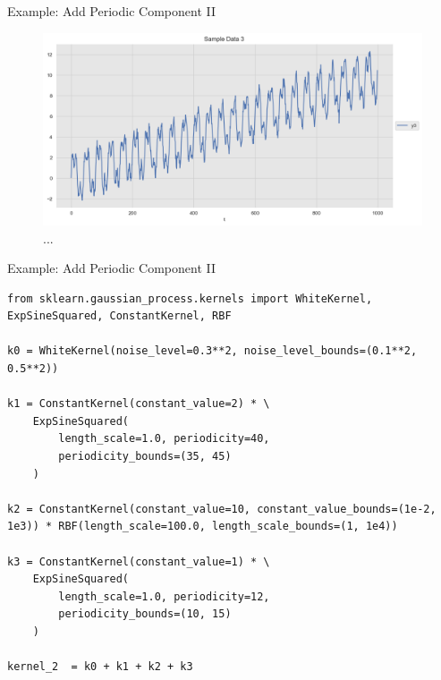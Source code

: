 \documentclass[10pt]{beamer}
\begin{document}
\begin{frame}{Example: Add Periodic Component II }
\begin{center}
\begin{figure}
\includegraphics[scale=0.4]{images/gaussian_process_time_series_files/gaussian_process_time_series_56_0.png} 
\caption{ ...  }
\end{figure}
\end{center}
\end{frame}


\begin{frame}[fragile]{Example: Add Periodic Component II }
\begin{lstlisting}
from sklearn.gaussian_process.kernels import WhiteKernel, ExpSineSquared, ConstantKernel, RBF

k0 = WhiteKernel(noise_level=0.3**2, noise_level_bounds=(0.1**2, 0.5**2))

k1 = ConstantKernel(constant_value=2) * \ 
    ExpSineSquared(
        length_scale=1.0, periodicity=40, 
        periodicity_bounds=(35, 45)
    )

k2 = ConstantKernel(constant_value=10, constant_value_bounds=(1e-2, 1e3)) * RBF(length_scale=100.0, length_scale_bounds=(1, 1e4)) 

k3 = ConstantKernel(constant_value=1) * \ 
    ExpSineSquared(
        length_scale=1.0, periodicity=12, 
        periodicity_bounds=(10, 15)
    )

kernel_2  = k0 + k1 + k2 + k3
\end{lstlisting}
\end{frame}
\end{document}
